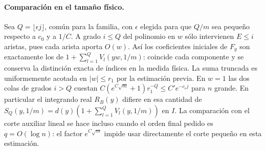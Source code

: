 \paragraph{Comparación en el tamaño físico.}
Sea $Q=\lfloor\epsilon j\rfloor$, común para la familia, con $\epsilon$ elegida
para que $Q/m$ sea pequeño respecto a $c_0$ y a $1/C$.
A grado $i\le Q$ del polinomio en $w$ sólo intervienen $E\le i$ aristas,
pues cada arista aporta $O(w)$. Así los coeficientes iniciales de $F_y$ son
exactamente los de $1+\sum_{l=1}^Q V_l(yw,1/m)$: coincide cada componente y
se conserva la distinción exacta de índices en la medida física.
La suma truncada es uniformemente acotada en $|w|\le r_1$ por la estimación previa.
En $w=1$ las dos colas de grados $i>Q$ cuestan
$C(e^{C\sqrt m}+1)r_1^{-Q}\le C'e^{-c_\epsilon j}$ para $n$ grande.
En particular el integrando real $R_B(y)$ difiere en esa cantidad de
$S_Q(y,1/m)=d(y)(1+\sum_{l=1}^Q V_l(y,1/m))$ en $I$.
La comparación con el corte auxiliar lineal se hace incluso cuando el orden
final pedido es $q=O(\log n)$: el factor $e^{C\sqrt m}$ impide usar directamente
el corte pequeño en esta estimación.
